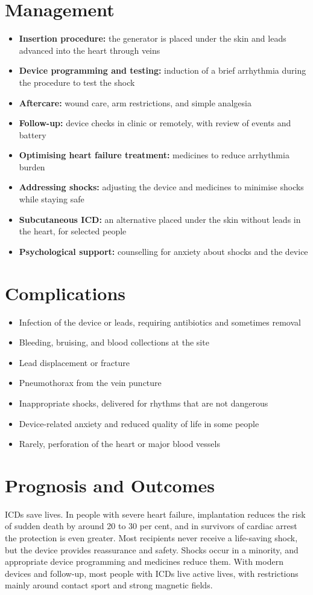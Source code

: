 \section*{Management}
\begin{itemize}
    \item \textbf{Insertion procedure:} the generator is placed under the skin and leads advanced into the heart through veins
    \item \textbf{Device programming and testing:} induction of a brief arrhythmia during the procedure to test the shock
    \item \textbf{Aftercare:} wound care, arm restrictions, and simple analgesia
    \item \textbf{Follow-up:} device checks in clinic or remotely, with review of events and battery
    \item \textbf{Optimising heart failure treatment:} medicines to reduce arrhythmia burden
    \item \textbf{Addressing shocks:} adjusting the device and medicines to minimise shocks while staying safe
    \item \textbf{Subcutaneous ICD:} an alternative placed under the skin without leads in the heart, for selected people
    \item \textbf{Psychological support:} counselling for anxiety about shocks and the device
\end{itemize}

\section*{Complications}
\begin{itemize}
    \item Infection of the device or leads, requiring antibiotics and sometimes removal
    \item Bleeding, bruising, and blood collections at the site
    \item Lead displacement or fracture
    \item Pneumothorax from the vein puncture
    \item Inappropriate shocks, delivered for rhythms that are not dangerous
    \item Device-related anxiety and reduced quality of life in some people
    \item Rarely, perforation of the heart or major blood vessels
\end{itemize}

\section*{Prognosis and Outcomes}
ICDs save lives. In people with severe heart failure, implantation reduces the risk of sudden death by around 20 to 30 per cent, and in survivors of cardiac arrest the protection is even greater. Most recipients never receive a life-saving shock, but the device provides reassurance and safety. Shocks occur in a minority, and appropriate device programming and medicines reduce them. With modern devices and follow-up, most people with ICDs live active lives, with restrictions mainly around contact sport and strong magnetic fields.

